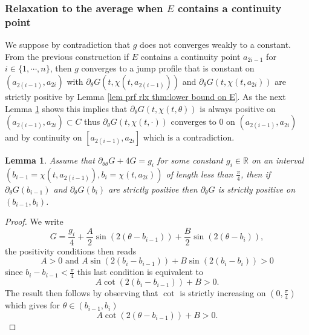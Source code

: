 \documentclass[10pt]{article}
\numberwithin{equation}{section}
\theoremstyle{plain}
\newtheorem{lemma}{Lemma}[section]
\theoremstyle{definition}
\numberwithin{equation}{section}
\begin{document}
\subsubsection{Relaxation to the average when $E$ contains a continuity point}
We suppose by contradiction that $g$ does not converges weakly to a constant. From the previous construction if $E$ contains a continuity point $a_{2i-1}$ for $i\in \{1,\cdots,n\}$, then $g$ converges to a jump profile that is constant on $(a_{2(i-1)},a_{2i})$ with $\partial_\theta G(t,\chi(t,a_{2(i-1)}))$ and $\partial_\theta G(t,\chi(t,a_{2i}))$ are strictly positive by Lemma \ref{lem prf rlx thm:lower bound on E}. As the next Lemma \ref{lem:prf rlx cst c0} shows this implies that $\partial_\theta G(t,\chi(t,\theta))$ is always positive on $(a_{2(i-1)},a_{2i})\subset C$ thus $\partial_\theta G(t,\chi(t,\cdot))$ converges to $0$ on $(a_{2(i-1)},a_{2i})$ and by continuity on $[a_{2(i-1)},a_{2i}]$ which is a contradiction.
\begin{lemma}\label{lem:prf rlx cst c0}
Assume that $\partial_{\theta\theta}G+4G=g_i$ for some constant $g_i\in \mathbb{R}$ on an interval $(b_{i-1}=\chi(t,a_{2(i-1)}),b_i=\chi(t,a_{2i}))$ of length less than $\frac{\pi}{4}$, then if $\partial_\theta G(b_{i-1})$ and $\partial_\theta G(b_{i})$ are strictly positive then $\partial_\theta G$ is strictly positive on $(b_{i-1},b_i)$.
\end{lemma}
\begin{proof}
We write 
\[
G=\frac{g_i}{4}+\frac{A}{2}\sin(2(\theta-b_{i-1}))+\frac{B}{2}\sin(2(\theta-b_{i})),
\]
the positivity conditions then reads
\[
A>0 \text{ and } A\sin(2(b_i-b_{i-1}))+B\sin(2(b_i-b_{i}))>0
\]
since $b_i-b_{i-1}<\frac{\pi}{4}$ this last condition is equivalent to 
\[
A\cot(2(b_i-b_{i-1}))+B>0.
\]
The result then follows by observing that $\cot$ is strictly increasing on $(0,\frac{\pi}{4})$ which gives for $\theta\in (b_{i-1},b_i)$
\[
A\cot(2(\theta-b_{i-1}))+B>0.
\]
\end{proof}
\end{document}
